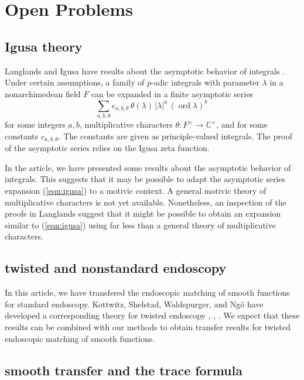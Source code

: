 \documentclass[12pt]{amsart}
\newcommand{\op}[1]{\operatorname{#1}}
\newcommand{\ring}[1]{{\mathbb #1}}
\theoremstyle{plain}
\theoremstyle{definition}
\begin{document}
\section{Open Problems}

\subsection{Igusa theory}

Langlands and Igusa have results about the asymptotic behavior of
integrals \cite{langlands:sl3} \cite{igusa}.  Under certain
assumptions, a family of $p$-adic integrals with parameter $\lambda$
in a nonarchimedean field $F$ can be expanded in a finite asymptotic
series
\begin{equation}\label{eqn:igusa}
\sum_{a,b,\theta} c_{a,b,\theta} \,
\theta(\lambda) \,|\lambda|^a \, (\op{ord}\lambda)^b\, 
\end{equation}
for some integers $a,b$, multiplicative characters $\theta:F^\times\to
\ring{C}^\times$, and for some constants $c_{a,b,\theta}$.  The
constants are given as principle-valued integrals.  The proof of the
asymptotic series relies on the Igusa zeta function.

In the article, we have presented some results about the asymptotic
behavior of integrals.  This suggests that it may be possible to adapt
the asymptotic series expansion (\ref{eqn:igusa}) to a motivic
context.  A general motivic theory of multiplicative characters is
not yet available.  Nonetheless, an inspection of the proofs in
Langlands suggest that it might be possible to obtain an
expansion similar to (\ref{eqn:igusa}) using far less than a general
theory of multiplicative characters.

\subsection{twisted and nonstandard endoscopy}

In this article, we have transfered the endoscopic matching of smooth
functions for standard endoscopy.  Kottwitz, Shelstad, Waldspurger,
and Ng\^o have developed a corresponding theory for twisted endoscopy
\cite{kottwitz-shelstad}, \cite{waldspurger}, \cite{ngo}.  We expect
that these results can be combined with our methods to obtain transfer
results for twisted endoscopic matching of smooth functions.

\subsection{smooth transfer and the trace formula}
\end{document}
